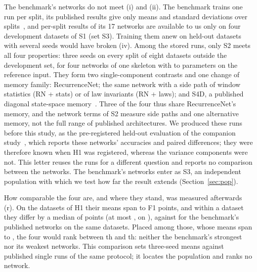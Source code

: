 \documentclass{IEEE_lsens}
\begin{document}
The benchmark's networks do not meet (i) and (ii). The benchmark trains one run per split, its published results give
only means and standard deviations over splits~\cite{burzer2026arena}, and per-split results of its 17 networks are
available to us only on four development datasets of S1 (set S3). Training them anew on held-out datasets with
several seeds would have broken (iv). Among the stored runs, only S2 meets all four properties: three seeds on every
split of eight datasets outside the development set, for four networks of one skeleton with 
to  parameters on the reference input. They form two single-component contrasts and
one change of memory family: RecurrenceNet; the same network with a side path of window statistics (RN + stats) or of
law invariants (RN + laws); and S4D, a published diagonal state-space memory~\cite{gu2022parameterization}. Three of
the four thus share RecurrenceNet's memory, and the network terms of S2 measure side paths and one alternative memory,
not the full range of published architectures. We produced these runs before this study, as the pre-registered
held-out evaluation of the companion study~\cite{le2026rila}, which reports these networks' accuracies and paired
differences; they were therefore known when H1 was registered, whereas the variance components were not. This letter
reuses the runs for a different question and reports no comparison between the networks. The benchmark's networks enter as S3, an independent population with which we test how far the
result extends (Section~\ref{sec:pop}).

How comparable the four are, and where they stand, was measured afterwards (r). On the 
datasets of H1 their means span  to  F1 points, and within a
dataset they differ by a median of  points (at most , on
), against  for the benchmark's 
published networks on the same datasets. Placed among those, whose means span  to
, the four would rank between th and th:
neither the benchmark's strongest nor its weakest networks. This comparison sets three-seed means against published
single runs of the same protocol; it locates the population and ranks no network.
\end{document}
